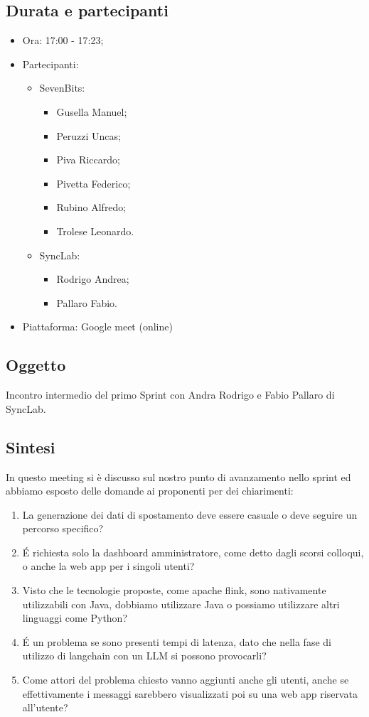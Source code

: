 \documentclass[12pt]{article}
\begin{document}
\subsection{Durata e partecipanti}
\begin{itemize}
\item Ora: 17:00 - 17:23;
\item Partecipanti: 	
	\begin{itemize}
        \item SevenBits:
        \begin{itemize}
			\item Gusella Manuel;
			\item Peruzzi Uncas;
			\item Piva Riccardo;
			\item Pivetta Federico;
			\item Rubino Alfredo;
			\item Trolese Leonardo.
		\end{itemize}
		\item SyncLab:
		\begin{itemize}
			\item Rodrigo Andrea;
			\item Pallaro Fabio.
		\end{itemize}
	\end{itemize}
\item Piattaforma: Google meet (online)
\end{itemize}
\subsection{Oggetto}
Incontro intermedio del primo Sprint con Andra Rodrigo e Fabio Pallaro di SyncLab.

\subsection{Sintesi}
In questo meeting si è discusso sul nostro punto di avanzamento nello sprint ed abbiamo esposto delle domande ai proponenti per dei chiarimenti:\\
\begin{enumerate}
\item \label{uno} La generazione dei dati di spostamento deve essere casuale o deve seguire un percorso specifico?
\item \label{due} \'E richiesta solo la dashboard amministratore, come detto dagli scorsi colloqui, o anche la web app per i singoli utenti?
\item \label{tre} Visto che le tecnologie proposte, come apache flink, sono nativamente utilizzabili con Java, dobbiamo utilizzare Java o possiamo utilizzare altri linguaggi come Python?
\item \label{quattro} \'E un problema se sono presenti tempi di latenza, dato che nella fase di utilizzo di langchain con un LLM si possono provocarli?
\item \label{cinque} Come attori del problema chiesto vanno aggiunti anche gli utenti, anche se effettivamente i messaggi sarebbero visualizzati poi su una web app riservata all'utente?
\end{enumerate}
\end{document}
